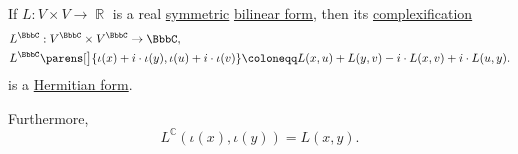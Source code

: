 \begin{proposition}\label{thm:complexification_of_symmetric_bilinear_form}
  If \( L: V \times V \to \BbbR \) is a real \hyperref[def:symmetric_function]{symmetric} \hyperref[def:bilinear_form]{bilinear form}, then its \hyperref[def:complexification]{complexification}
  \begin{equation*}
    \begin{aligned}
      &L^\BbbC: V^\BbbC \times V^\BbbC \to \BbbC, \\
      &L^\BbbC\parens[\big]{ \iota(x) + i \cdot \iota(y), \iota(u) + i \cdot \iota(v) } \coloneqq L(x, u) + L(y, v) - i \cdot L(x, v) + i \cdot L(u, y).
    \end{aligned}
  \end{equation*}
  is a \hyperref[def:hermitian_form]{Hermitian form}.

  Furthermore,
  \begin{equation*}
    L^\BbbC(\iota(x), \iota(y)) = L(x, y).
  \end{equation*}
\end{proposition}
